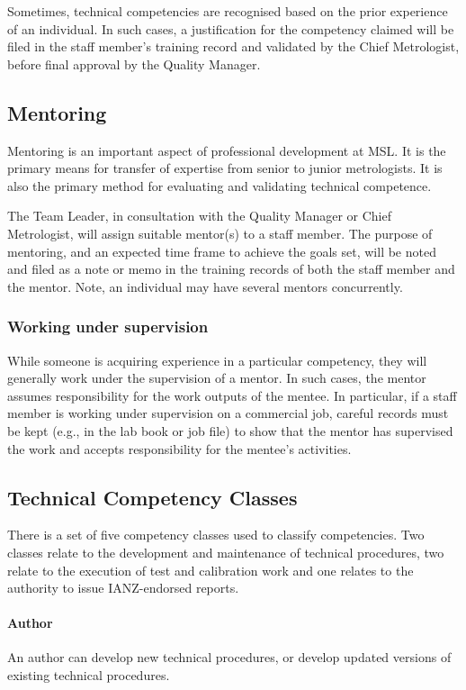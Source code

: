 Sometimes, technical competencies are recognised based on the prior experience of an individual. In such cases, a justification for the competency claimed will be filed in the staff member's training record and validated by the Chief Metrologist, before final approval by the Quality Manager. 

\subsection{Mentoring}
\label{ss:mentoring}
Mentoring is an important aspect of professional development at MSL. It is the primary means for transfer of expertise from senior to junior metrologists. It is also the primary method for evaluating and validating technical competence.

The Team Leader, in consultation with the Quality Manager or Chief Metrologist, will assign suitable mentor(s) to a staff member. The purpose of mentoring, and an expected time frame to achieve the goals set, will be noted and filed as a note or memo in the training records of both the staff member and the mentor. Note, an individual may have several mentors concurrently.

\subsubsection{Working under supervision}
While someone is acquiring experience in a particular competency, they will generally work under the supervision of a mentor. In such cases, the mentor assumes responsibility for the work outputs of the mentee. In particular, if a staff member is working under supervision on a commercial job, careful records must be kept (e.g., in the lab book or job file) to show that the mentor has supervised the work and accepts responsibility for the mentee's activities.

\subsection{Technical Competency Classes}
There is a set of five competency classes used to classify competencies. Two classes relate to the development and maintenance of technical procedures, two relate to the execution of test and calibration work and one relates to the authority to issue IANZ-endorsed reports. 

\paragraph{Author}
An author can develop new technical procedures, or develop updated versions of existing technical procedures.

